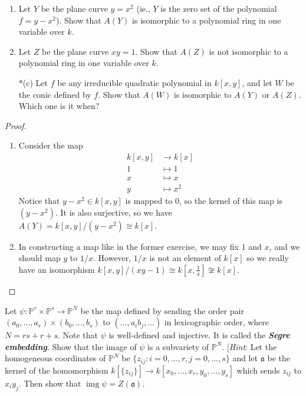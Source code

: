 \documentclass{article}
\renewcommand{\P}{\mathbb{P}}
\newcommand{\af}{\mathfrak{a}}
\DeclareMathOperator{\img}{img}
\begin{document}
\begin{exercise}
	\begin{enumerate}[label*=(\alph*)]\leavevmode
		\item Let $Y$ be the plane curve $y=x^2$ (ie., $Y$ is the zero set of the polynomial $f=y-x^2$). Show that $A(Y)$ is isomorphic to a polynomial ring in one variable over $k$.
		\item Let $Z$ be the plane curve $xy=1$. Show that $A(Z)$ is not isomorphic to a polynomial ring in one variable over $k$.
		\item[*(c)] Let $f$ be any irreducible quadratic polynomial in $k[x,y]$, and let $W$ be the conic defined by $f$. Show that $A(W)$ is isomorphic to $A(Y)$ or $A(Z)$. Which one is it when?
	\end{enumerate}
\end{exercise}
\begin{proof}\leavevmode
	\begin{enumerate}[label=(\alph*)]
		\item Consider the map
		\begin{align*}
			k[x,y]&\to k[x]\\
			1&\mapsto1\\
			x&\mapsto x\\
			y&\mapsto x^2
		\end{align*}
		Notice that $y-x^2\in k[x,y]$ is mapped to $0$, so the kernel of this map is $(y-x^2)$. It is also surjective, so we have $A(Y)=k[x,y]/(y-x^2)\cong k[x]$.
		\item In constructing a map like in the former exercise, we may fix $1$ and $x$, and we should map $y$ to $1/x$. However, $1/x$ is not an element of $k[x]$ so we really have an isomorphism $k[x,y]/(xy-1)\cong k[x,\frac{1}{x}]\not\cong k[x]$.
	\end{enumerate}
\end{proof}
\begin{exercise}
	Let $\psi:\P^r\times\P^s\to\P^N$ be the map defined by sending the order pair $(a_0,\ldots,a_r)\times(b_0,\ldots,b_s)$ to $(\ldots,a_ib_j,\ldots)$ in lexicographic order, where $N=rs+r+s$. Note that $\psi$ is well-defined and injective. It is called the \textbf{\textit{Segre embedding}}. Show that the image of $\psi$ is a subvariety of $\P^N$. [\textit{Hint}: Let the homogeneous coordinates of $\P^N$ be $\{z_{ij}:i=0,\ldots,r,j=0,\ldots,s\}$ and let $\af$ be the kernel of the homomorphism $k[\{z_{ij}\}]\to k[x_0,\ldots,x_r,y_0,\ldots,y_s]$ which sends $z_{ij}$ to $x_iy_j$. Then show that $\img\psi=Z(\af)$.
\end{exercise}
\end{document}
